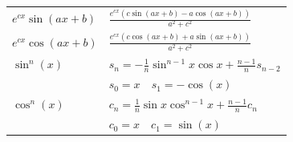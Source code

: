 \documentclass[6pt]{article}
\begin{document}
\begin{multicols*}{2}
\begin{multicols}{2}
\begin{tabular}{l|l}
		$ \scriptstyle e^{cx} \sin (ax+b)  $  &  $ \frac{e^{cx} \left( c \sin (ax+b)-a \cos(ax+b) \right)}{a^2+c^2}  $ \\
		$ \scriptstyle e^{cx} \cos (ax+b)  $  &  $ \frac{e^{cx} \left( c \cos (ax+b)+a \sin(ax+b) \right)}{a^2+c^2}  $ \\
		$ \sin^n(x) $  &  $ \scriptstyle s_n=-\frac{1}{n} \sin^{n-1}x \cos x+\frac{n-1}{n} s_{n-2} $ \\
		$  $  &  $ \scriptstyle s_0 = x\quad s_1 = - \cos(x) $ \\
		$ \cos^n(x) $  &  $ \scriptstyle c_n=\frac{1}{n} \sin x \cos^{n-1} x + \frac{n-1}{n} c_n $ \\
		$  $  &  $ \scriptstyle c_0 = x\quad c_1 = \sin(x) $ \\

		
	\end{tabular}
	\end{multicols}
	
	\vspace{1mm}
	\quad 
	

\columnbreak

\end{multicols*}
\end{document}
